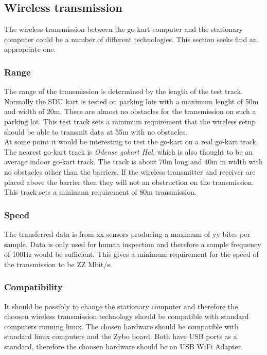 



\subsection{Wireless transmission}
The wireless transmission between the go-kart computer and the stationary computer could be a number of different technologies.
This section seeks find an appropriate one.

\subsubsection{Range}
The range of the transmission is determined by the length of the test track. 
Normally the SDU kart is tested on parking lots with a maximum lenght of 50m and width of 20m.
There are almost no obstacles for the transmission on such a parking lot. 
This test track sets a minimum requirement that the wireless setup should be able to transmit data at 55m with no obstacles.
\\
At some point it would be interesting to test the go-kart on a real go-kart track. 
The nearest go-kart track is \textit{Odense gokart Hal}, which is also thought to be an average indoor go-kart track.
The track is about 70m long and 40m in width with no obstacles other than the barriers. 
If the wireless transmitter and receiver are placed above the barrier then they will not an obstruction on the transmission. 
This track sets a minimum requirement of 80m transmission. 

\subsubsection{Speed}
The transferred data is from xx sensors producing a maximum of yy bites per sample. 
Data is only used for human inspection and therefore a sample frequency of 100Hz would be sufficient.
This gives a minimum requirement for the speed of the transmission to be ZZ Mbit/s. 

\subsubsection{Compatibility}
It should be possibly to change the stationary computer and therefore the choosen wireless transmission technology should be compatible with standard computers running linux.
The chosen hardware should be compatible with standard linux computers and the Zybo board. 
Both have USB ports as a standard, therefore the choosen hardware should be an USB WiFi Adapter.

